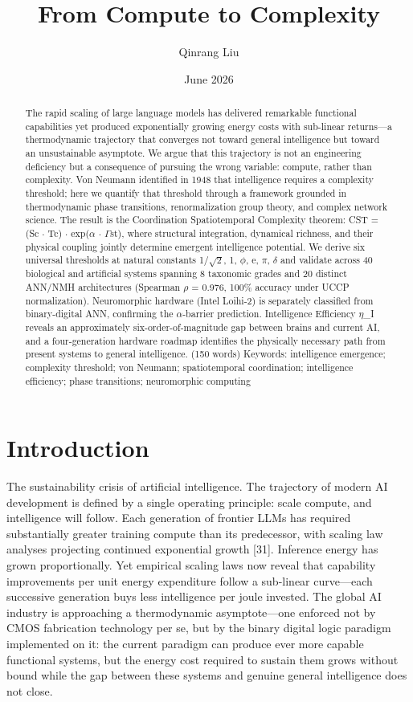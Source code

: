 \documentclass[a4paper,12pt]{article}
\title{From Compute to Complexity}
\author{Qinrang Liu}
\date{June 2026}
\begin{document}
\maketitle
\begin{abstract}
The rapid scaling of large language models has delivered remarkable functional capabilities yet produced exponentially growing energy costs with sub-linear returns---a thermodynamic trajectory that converges not toward general intelligence but toward an unsustainable asymptote. We argue that this trajectory is not an engineering deficiency but a consequence of pursuing the wrong variable: compute, rather than complexity. Von Neumann identified in 1948 that intelligence requires a complexity threshold; here we quantify that threshold through a framework grounded in thermodynamic phase transitions, renormalization group theory, and complex network science. The result is the Coordination Spatiotemporal Complexity theorem: CST = (Sc $\cdot$ Tc) $\cdot$ exp($\alpha$ $\cdot$ $\Gamma$st), where structural integration, dynamical richness, and their physical coupling jointly determine emergent intelligence potential. We derive six universal thresholds at natural constants {1/$\sqrt{2}$, 1, $\phi$, e, $\pi$, $\delta$} and validate across 40 biological and artificial systems spanning 8 taxonomic grades and 20 distinct ANN/NMH architectures (Spearman $\rho$ = 0.976, 100\% accuracy under UCCP normalization). Neuromorphic hardware (Intel Loihi-2) is separately classified from binary-digital ANN, confirming the $\alpha$-barrier prediction. Intelligence Efficiency $\eta$\_I reveals an approximately six-order-of-magnitude gap between brains and current AI, and a four-generation hardware roadmap identifies the physically necessary path from present systems to general intelligence. (150 words) Keywords: intelligence emergence; complexity threshold; von Neumann; spatiotemporal coordination; intelligence efficiency; phase transitions; neuromorphic computing
\end{abstract}

\section{Introduction}

The sustainability crisis of artificial intelligence. The trajectory of modern AI development is defined by a single operating principle: scale compute, and intelligence will follow. Each generation of frontier LLMs has required substantially greater training compute than its predecessor, with scaling law analyses projecting continued exponential growth [31]. Inference energy has grown proportionally. Yet empirical scaling laws now reveal that capability improvements per unit energy expenditure follow a sub-linear curve---each successive generation buys less intelligence per joule invested. The global AI industry is approaching a thermodynamic asymptote---one enforced not by CMOS fabrication technology per se, but by the binary digital logic paradigm implemented on it: the current paradigm can produce ever more capable functional systems, but the energy cost required to sustain them grows without bound while the gap between these systems and genuine general intelligence does not close.
\end{document}

